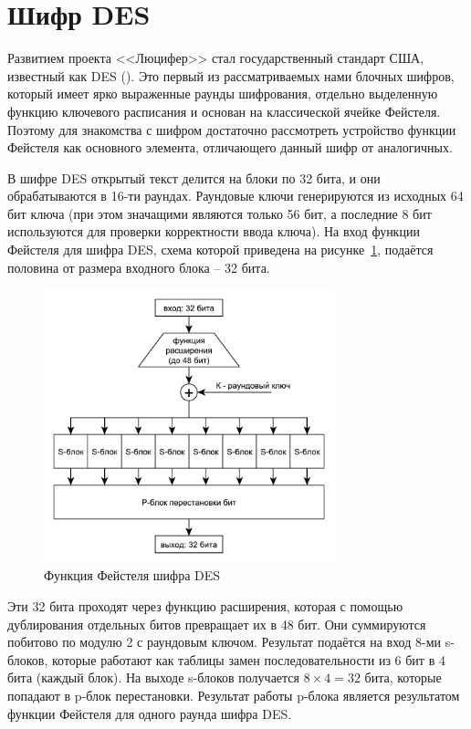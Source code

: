 \section{Шифр DES}

Развитием проекта <<Люцифер>> стал государственный стандарт США, известный как DES (). Это первый из рассматриваемых нами блочных шифров, который имеет ярко выраженные раунды шифрования, отдельно выделенную функцию ключевого расписания и основан на классической ячейке Фейстеля. Поэтому для знакомства с шифром достаточно рассмотреть устройство функции Фейстеля как основного элемента, отличающего данный шифр от аналогичных.

В шифре DES открытый текст делится на блоки по 32 бита, и они обрабатываются в 16-ти раундах. Раундовые ключи генерируются из исходных 64 бит ключа (при этом значащими являются только 56 бит, а последние 8 бит используются для проверки корректности ввода ключа). На вход функции Фейстеля для шифра DES, схема которой приведена на рисунке~\ref{fig:des}, подаётся половина от размера входного блока -- 32 бита.

\begin{figure}[!htb]
    \centering
    \includegraphics[width=0.75\textwidth]{pic/des}
    \caption{Функция Фейстеля шифра DES\label{fig:des}}
\end{figure}

Эти 32 бита проходят через функцию расширения, которая с помощью дублирования отдельных битов превращает их в 48 бит. Они суммируются побитово по модулю 2 с раундовым ключом. Результат подаётся на вход 8-ми s-блоков, которые работают как таблицы замен последовательности из 6 бит в 4 бита (каждый блок). На выходе s-блоков получается $8 \times 4 = 32$ бита, которые попадают в p-блок перестановки. Результат работы p-блока является результатом функции Фейстеля для одного раунда шифра DES.


